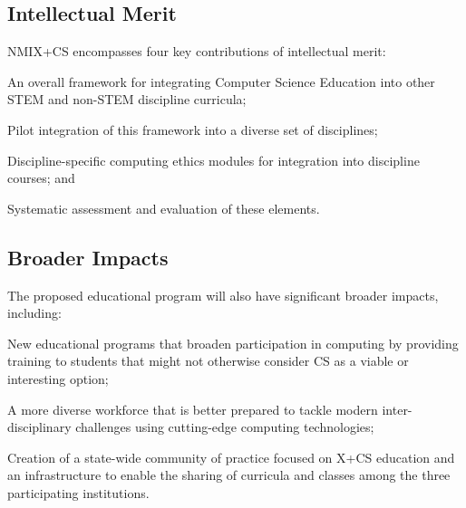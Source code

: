 \subsection{Intellectual Merit} 
NMIX+CS encompasses four key contributions of intellectual merit:
\begin{tightenumerate}
\item An overall framework for integrating Computer Science Education into other STEM and non-STEM discipline curricula;
\item Pilot integration of this framework into a diverse set of disciplines; 
\item Discipline-specific computing ethics modules for integration into discipline courses; and
\item Systematic assessment and evaluation of these elements.
\end{tightenumerate}

\subsection{Broader Impacts} 
The proposed educational program will also have significant broader impacts, including:
\begin{tightenumerate}
    \item New educational programs that broaden participation in computing by providing training to students that might not otherwise consider CS as a viable or interesting option;
    \item A more diverse workforce that is better prepared to tackle modern inter-disciplinary challenges using cutting-edge computing technologies;
    \item Creation of a state-wide community of practice focused on X+CS education and an infrastructure to enable the sharing of curricula and classes among the three participating institutions. 
\end{tightenumerate}

 



